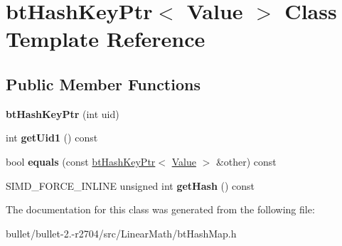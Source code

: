 \hypertarget{classbt_hash_key_ptr}{\section{bt\+Hash\+Key\+Ptr$<$ Value $>$ Class Template Reference}
\label{classbt_hash_key_ptr}
}
\subsection*{Public Member Functions}
\begin{DoxyCompactItemize}
\item 
\hypertarget{classbt_hash_key_ptr_ab33ccbffefbfd7e7e055d1661cd8b684}{{\bfseries bt\+Hash\+Key\+Ptr} (int uid)}\label{classbt_hash_key_ptr_ab33ccbffefbfd7e7e055d1661cd8b684}

\item 
\hypertarget{classbt_hash_key_ptr_af4a5ffbfc13bb16d4e052cf1dd38101c}{int {\bfseries get\+Uid1} () const }\label{classbt_hash_key_ptr_af4a5ffbfc13bb16d4e052cf1dd38101c}

\item 
\hypertarget{classbt_hash_key_ptr_a2ab9e3dccdfe8e252ecefde477bd2e3f}{bool {\bfseries equals} (const \hyperlink{classbt_hash_key_ptr}{bt\+Hash\+Key\+Ptr}$<$ \hyperlink{union_value}{Value} $>$ \&other) const }\label{classbt_hash_key_ptr_a2ab9e3dccdfe8e252ecefde477bd2e3f}

\item 
\hypertarget{classbt_hash_key_ptr_a7585aa4250544c15f36e4ae9fc0dd80b}{S\+I\+M\+D\+\_\+\+F\+O\+R\+C\+E\+\_\+\+I\+N\+L\+I\+N\+E unsigned int {\bfseries get\+Hash} () const }\label{classbt_hash_key_ptr_a7585aa4250544c15f36e4ae9fc0dd80b}

\end{DoxyCompactItemize}


The documentation for this class was generated from the following file\+:\begin{DoxyCompactItemize}
\item 
bullet/bullet-\/2.-\/r2704/src/\+Linear\+Math/bt\+Hash\+Map.\+h\end{DoxyCompactItemize}
